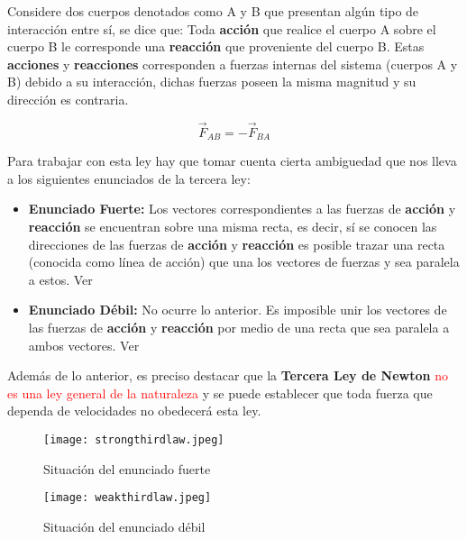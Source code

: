 \documentclass[/home/hernan/Documentos/Apuntes_mecanica_teorica/main.tex]{subfiles}
\begin{document}
	\begin{definition}
		Considere dos cuerpos denotados como A y B que presentan algún tipo de interacción entre sí, se dice que:
		Toda \textbf{acción} que realice el cuerpo A sobre el cuerpo B le corresponde una \textbf{reacción} que proveniente del cuerpo B. Estas \textbf{acciones} y \textbf{reacciones} corresponden a fuerzas internas del sistema (cuerpos A y B) debido a su interacción, dichas fuerzas poseen la misma magnitud y su dirección es contraria.
		
		\begin{equation}
			\vec{F}_{AB} = - \vec{F}_{BA}
			\label{eq: NThirdlaw}
		\end{equation}

		Para trabajar con esta ley hay que tomar cuenta cierta ambiguedad que nos lleva a los siguientes enunciados de la tercera ley:
		\begin{itemize}
			\item \textbf{Enunciado Fuerte: } Los vectores correspondientes a las fuerzas de \textbf{acción} y \textbf{reacción} se encuentran sobre una misma recta, es decir, sí se conocen las direcciones de las fuerzas de \textbf{acción} y \textbf{reacción} es posible trazar una recta (conocida como línea de acción) que una los vectores de fuerzas y sea paralela a estos. Ver 
			\item \textbf{Enunciado Débil: } No ocurre lo anterior. Es imposible unir los vectores de las fuerzas de \textbf{acción} y \textbf{reacción} por medio de una recta que sea paralela a ambos vectores. Ver 
		\end{itemize}

		Además de lo anterior, es preciso destacar que la \textbf{Tercera Ley de Newton} \textcolor{red}{no es una ley general de la naturaleza} y se puede establecer que toda fuerza que dependa de velocidades no obedecerá esta ley.
	\end{definition}

	\begin{marginfigure}
		\begin{figure}[H]
			\centering
			\texttt{[image: strongthirdlaw.jpeg]}
			\caption{Situación del enunciado fuerte}
			\label{fig: Nthirdstrong}
		\end{figure}
	\end{marginfigure}

	\begin{marginfigure}
		\begin{figure}[H]
			\centering
			\texttt{[image: weakthirdlaw.jpeg]}
			\caption{Situación del enunciado débil}
			\label{fig: Nthirdweak}
		\end{figure}
	\end{marginfigure}
\end{document}
